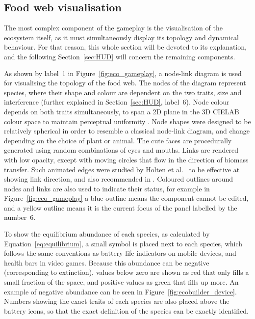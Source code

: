 \subsection{Food web visualisation}
\label{sec:eco_visualisation}
The most complex component of the gameplay is the visualisation of the ecosystem itself, as it must simultaneously display its topology and dynamical behaviour. For that reason, this whole section will be devoted to its explanation, and the following Section~\ref{sec:HUD} will concern the remaining components.

As shown by label~1 in Figure~\ref{fig:eco_gameplay}, a node-link diagram is used for visualising the topology of the food web.
The nodes of the diagram represent species, where their shape and colour are dependent on the two traits, size and interference (further explained in Section~\ref{sec:HUD}, label~6).
Node colour depends on both traits simultaneously, to span a 2D plane in the 3D CIELAB colour space to maintain perceptual uniformity \cite{Smart2019}.
Node shapes were designed to be relatively spherical in order to resemble a classical node-link diagram, and change depending on the choice of plant or animal. The cute faces are procedurally generated using random combinations of eyes and mouths.
Links are rendered with low opacity, except with moving circles that flow in the direction of biomass transfer. Such animated edges were studied by Holten et al.\ \cite{Holten2011} to be effective at showing link direction, and also recommended in \cite{Bach2017}.
Coloured outlines around nodes and links are also used to indicate their status, for example in Figure~\ref{fig:eco_gameplay} a blue outline means the component cannot be edited, and a yellow outline means it is the current focus of the panel labelled by the number~6.

To show the equilibrium abundance of each species, as calculated by Equation~\ref{eq:equilibrium}, a small symbol is placed next to each species, which follows the same conventions as battery life indicators on mobile devices, and health bars in video games. Because this abundance can be negative (corresponding to extinction), values below zero are shown as red that only fills a small fraction of the space, and positive values as green that fills up more. An example of negative abundance can be seen in Figure~\ref{fig:ecobuilder_device}.
Numbers showing the exact traits of each species are also placed above the battery icons, so that the exact definition of the species can be exactly identified.

